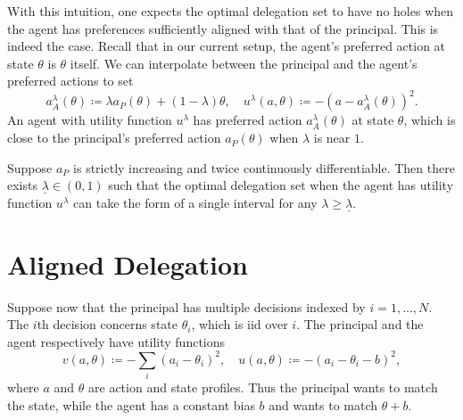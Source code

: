 With this intuition, one expects the optimal delegation set to have no holes when the agent has preferences sufficiently aligned with that of the principal.
This is indeed the case.
Recall that in our current setup, the agent's preferred action at state \(\theta\) is \(\theta\) itself.
We can interpolate between the principal and the agent's preferred actions to set
\[
  a_A^\lambda(\theta) \coloneq \lambda a_P(\theta) + (1 - \lambda) \theta, \quad
  u^\lambda(a, \theta) \coloneq -\left(a - a_A^\lambda(\theta)\right)^2.
\]
An agent with utility function \(u^\lambda\) has preferred action \(a_A^\lambda(\theta)\) at state \(\theta\), which is close to the principal's preferred action \(a_P(\theta)\) when \(\lambda\) is near \(1\).
\begin{proposition}
  Suppose \(a_P\) is strictly increasing and twice continuously differentiable.
  Then there exists \(\underline{\lambda} \in (0, 1)\) such that the optimal delegation set when the agent has utility function \(u^\lambda\) can take the form of a single interval for any \(\lambda \geq \underline{\lambda}\).
\end{proposition}



\section{Aligned Delegation}
Suppose now that the principal has multiple decisions indexed by \(i = 1, \dots, N\).
The \(i\)th decision concerns state \(\theta_i\), which is iid over \(i\).
The principal and the agent respectively have utility functions
\[
  v(a, \theta)
  \coloneq - \sum_i (a_i - \theta_i)^2, \quad
  u(a, \theta)
  \coloneq - (a_i - \theta_i - b)^2,
\]
where \(a\) and \(\theta\) are action and state profiles.
Thus the principal wants to match the state, while the agent has a constant bias \(b\) and wants to match \(\theta + b\).


